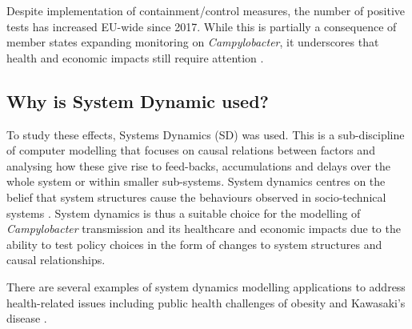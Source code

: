 Despite implementation of containment/control measures, the number of positive tests has increased EU-wide since 2017. While this is partially a consequence of member states expanding monitoring on \textit{Campylobacter}, it underscores that health and economic impacts still require attention \parencite{nastasijevic_european_2020}.

\subsection*{Why is System Dynamic used?}

To study these effects, Systems Dynamics (SD) was used. This is a sub-discipline of computer modelling that focuses on causal relations between factors and analysing how these give rise to feed-backs, accumulations and delays over the whole system or within smaller sub-systems. System dynamics centres on the belief that system structures cause the behaviours observed in socio-technical systems \parencite{pruyt_triple_2013}. System dynamics is thus a suitable choice for the modelling of \textit{Campylobacter} transmission and its healthcare and economic impacts due to the ability to test policy choices in the form of changes to system structures and causal relationships.

There are several examples of system dynamics modelling applications to address health-related issues including public health challenges of obesity \parencite{chen_obesity_2018} and Kawasaki's disease \parencite{huang_epidemiology_2013}. 


